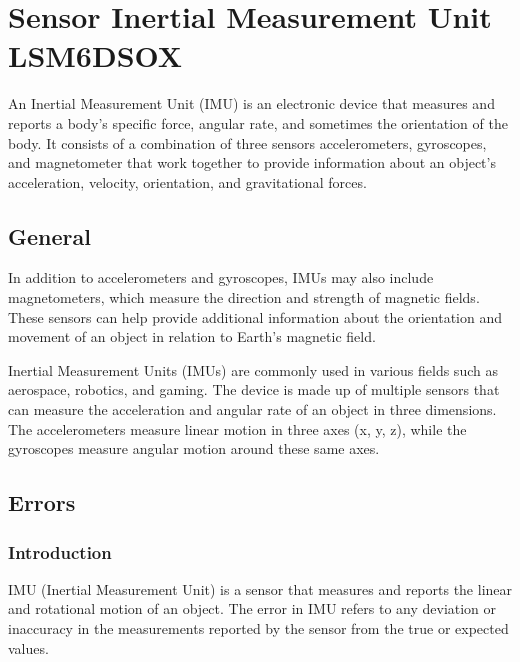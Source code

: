%
%


\chapter{Sensor Inertial Measurement Unit LSM6DSOX}  \label{chap:InertialMeasurementUnit}

An Inertial Measurement Unit (IMU) is an electronic device that measures and reports a body's specific force, angular rate, and sometimes the orientation of the body. It consists of a combination of three sensors accelerometers,  gyroscopes, and magnetometer that work together to provide information about an object's acceleration, velocity, orientation, and gravitational forces.\cite{sabatini:2011}





\section{General}


In addition to accelerometers and gyroscopes, IMUs may also include magnetometers, which measure the direction and strength of magnetic fields. These sensors can help provide additional information about the orientation and movement of an object in relation to Earth's magnetic field.\cite{Wang:2022}

\bigskip

Inertial Measurement Units (IMUs) are commonly used in various fields such as aerospace, robotics, and gaming. The device is made up of multiple sensors that can measure the acceleration and angular rate of an object in three dimensions. The accelerometers measure linear motion in three axes (x, y, z), while the gyroscopes measure angular motion around these same axes.\cite{wahyudi:2011}

\section{Errors}  \label{Chap: Errors}

\subsection{Introduction}

IMU (Inertial Measurement Unit) is a sensor that measures and reports the linear and rotational motion of an object. The error in IMU refers to any deviation or inaccuracy in the measurements reported by the sensor from the true or expected values.

